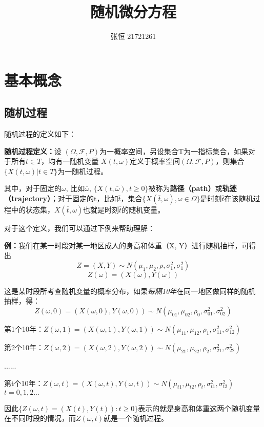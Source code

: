 \documentclass{article}
\title{随机微分方程}
\author{张恒  21721261}
\begin{document}
\maketitle
\newpage
\tableofcontents
\newpage


\section{基本概念}
\subsection{随机过程}
随机过程的定义如下：

\textbf{随机过程定义：}设 $(\Omega ,{\mathcal  {F}},P)$为一概率空间，另设集合T为一指标集合，如果对于所有$t\in T$，均有一随机变量 $X(t,\omega)$定义于概率空间$(\Omega ,{\mathcal  {F}},P)$，则集合$\{X(t,\omega)|t\in T\}$为一随机过程。

其中，对于固定的$\omega$, 比如$\overline{\omega}$, $\{X(t,\overline{\omega}), t \geq 0\}$被称为\textbf{路径（path）}或\textbf{轨迹（trajectory）}；对于固定的t，比如$\overline{t}$，集合$\{X(\overline{t},\omega), \omega \in \Omega\}$是时刻$\overline{t}$在该随机过程中的状态集，$X(\overline{t},\omega)$也就是时刻$\overline{t}$的随机变量。

对于这个定义，我们可以通过下例来帮助理解：

\textbf{例：}我们在某一时段对某一地区成人的身高和体重（X, Y）进行随机抽样，可得出 
$$Z = (X,Y) \sim N(\mu_1,\mu_2,\rho,\sigma^2_1,\sigma^2_1)$$
$$Z(\omega) = (X(\omega),Y(\omega))$$

 这是某时段所考查随机变量的概率分布，如果\textit{每隔10年}在同一地区做同样的随机抽样，得： \\
$$Z(\omega,0)=(X(\omega,0),Y(\omega,0)) \sim N(\mu_{01},\mu_{02},\rho_0,\sigma^2_{01},\sigma^2_{02})$$

 第1个10年：$Z(\omega,1)=(X(\omega,1),Y(\omega,1)) \sim N(\mu_{11},\mu_{12},\rho_1,\sigma^2_{11},\sigma^2_{12})$

 第2个10年：$Z(\omega,2)=(X(\omega,2),Y(\omega,2)) \sim N(\mu_{21},\mu_{22},\rho_2,\sigma^2_{21},\sigma^2_{22})$

 ......

 第t个10年：$Z(\omega,t)=(X(\omega,t),Y(\omega,t)) \sim N(\mu_{t1},\mu_{t2},\rho_t,\sigma^2_{t1},\sigma^2_{t2})$ $t = 0,1,2...$

因此$\{Z(\omega,t)=(X(t),Y(t)): t \geq 0\}$表示的就是身高和体重这两个随机变量在不同时段的情况，而$Z(\omega,t)$就是一个随机过程。
\end{document}
